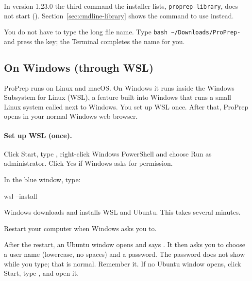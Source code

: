 \begin{watchout}
In version 1.23.0 the third command the installer lists,
\texttt{proprep-library}, does not start (). Section~\ref{sec:cmdline-library} shows the command to use instead.
\end{watchout}

\begin{tip}
You do not have to type the long file name. Type
\texttt{bash \textasciitilde/Downloads/ProPrep-} and press the  key;
the Terminal completes the name for you.
\end{tip}

\subsection{On Windows (through WSL)}
\label{sec:installation-windows}

ProPrep runs on Linux and macOS. On Windows it runs inside the Windows
Subsystem for Linux (WSL), a feature built into Windows that runs a small Linux
system called  next to Windows. You set up WSL once. After that,
ProPrep opens in your normal Windows web browser.

\paragraph{Set up WSL (once).}
\begin{steps}
  \item Click \textsf{Start}, type , right-click
        \textsf{Windows PowerShell} and choose \textsf{Run as administrator}.
        Click \textsf{Yes} if Windows asks for permission.
  \item In the blue window, type:
\begin{terminal}
wsl --install
\end{terminal}
        Windows downloads and installs WSL and Ubuntu. This takes several
        minutes.
  \item Restart your computer when Windows asks you to.
  \item After the restart, an Ubuntu window opens and says
        . It then asks you
        to choose a user name (lowercase, no spaces) and a password. The
        password does not show while you type; that is normal. Remember it.
        If no Ubuntu window opens, click \textsf{Start}, type
        , and open it.
\end{steps}

